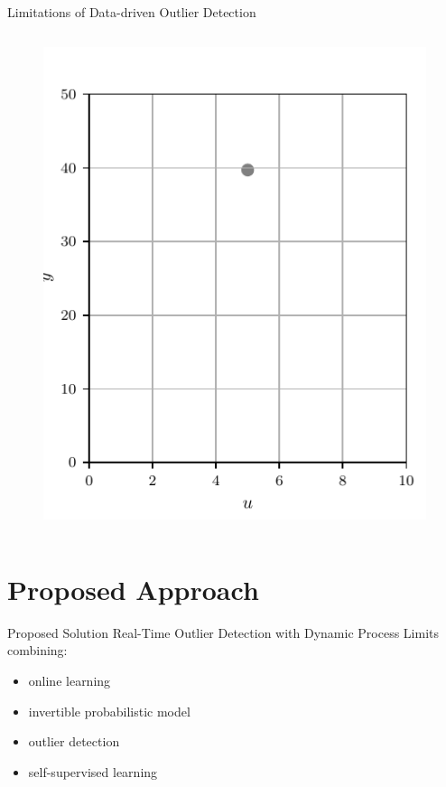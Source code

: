 \documentclass[aspectratio=169]{beamer}
\begin{document}
\begin{frame}{Limitations of Data-driven Outlier Detection}
\begin{columns}
\begin{column}{0.38\textwidth}
{\begin{figure}
                    \includegraphics[width=\textwidth]{../ilustrate/pc2023/sample/unlabeled_data_0.pdf}
                \end{figure}
            }
        \end{column}
    \end{columns}
    
\end{frame}

\section{Proposed Approach}

\begin{frame}{Proposed Solution}
    Real-Time Outlier Detection with Dynamic Process Limits
    combining:
    \begin{itemize}
        \item online learning
        \item invertible probabilistic model
        \item outlier detection
        \item self-supervised learning
    \end{itemize}
\end{frame}
\end{document}
